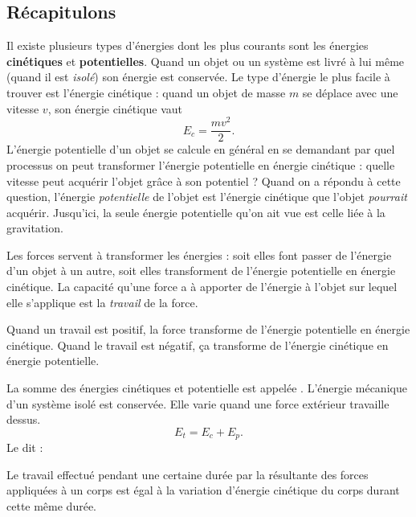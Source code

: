 \subsection{Récapitulons}

Il existe plusieurs types d'énergies dont les plus courants sont les énergies {\bf cinétiques} et {\bf potentielles}. Quand un objet ou un système est livré à lui même (quand il est \emph{isolé}) son énergie est conservée. Le type d'énergie le plus facile à trouver est l'énergie cinétique : quand un objet de masse $m$ se déplace avec une vitesse $v$, son énergie cinétique vaut
\begin{equation}
E_c=\frac{mv^2}{2}.
\end{equation}
L'énergie potentielle d'un objet se calcule en général en se demandant par quel processus on peut transformer l'énergie potentielle en énergie cinétique : quelle vitesse peut acquérir l'objet grâce à son potentiel ? Quand on a répondu à cette question, l'énergie \emph{potentielle} de l'objet est l'énergie cinétique que l'objet \emph{pourrait} acquérir. Jusqu'ici, la seule énergie potentielle qu'on ait vue est celle liée à la gravitation.

Les forces servent à transformer les énergies : soit elles font passer de l'énergie d'un objet à un autre, soit elles transforment de l'énergie potentielle en énergie cinétique. La capacité qu'une force a à apporter de l'énergie à l'objet sur lequel elle s'applique est la \emph{travail} de la force. 

Quand un travail est positif, la force transforme de l'énergie potentielle en énergie cinétique. Quand le travail est négatif, ça transforme de l'énergie cinétique en énergie potentielle.

La somme des énergies cinétiques et potentielle est appelée . L'énergie mécanique d'un système isolé est conservée. Elle varie quand une force extérieur travaille dessus.
\begin{equation}
E_t=E_c+E_p.
\end{equation}
Le  dit  :

\begin{theoreme}
Le travail effectué pendant une certaine durée par la résultante des forces appliquées à un corps est égal à la variation d'énergie cinétique du corps durant cette même durée.
\end{theoreme}

